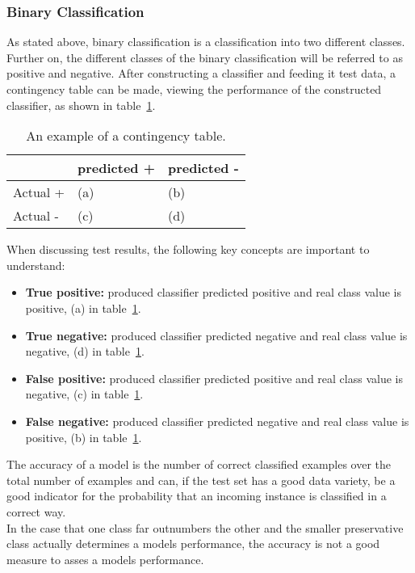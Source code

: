 \subsubsection{Binary Classification}
As stated above, binary classification is a classification into two different classes.
Further on, the different classes of the binary classification will be referred to as positive and negative.
After constructing a classifier and feeding it test data, a contingency table can be made, viewing the performance of the constructed classifier, as shown in table~\ref{tab:contingency}.
\begin{center}
	\begin{table}[H]
		\begin{tabular}{l|ll}
			& predicted + & predicted - \\ \hline
			Actual + &     (a)     &       (b)     \\
			Actual - &     (c)     &       (d)    
		\end{tabular}
		\caption{An example of a contingency table.}
		\label{tab:contingency}
	\end{table}
\end{center}
When discussing test results, the following key concepts are important to understand:
\begin{itemize}
	\item \textbf{True positive:} produced classifier predicted positive and real class value is positive, (a) in table~\ref{tab:contingency}. 
	\item \textbf{True negative:} produced classifier predicted negative and real class value is negative, (d) in table~\ref{tab:contingency}. 
	\item \textbf{False positive:} produced classifier predicted positive and real class value is negative, (c) in table~\ref{tab:contingency}. 
	\item \textbf{False negative:} produced classifier predicted negative and real class value is positive, (b) in table~\ref{tab:contingency}. 
\end{itemize} 
The accuracy of a model is the number of correct classified examples over the total number of examples and can, if the test set has a good data variety, be a good indicator for the probability that an incoming instance is classified in a correct way.\\
In the case that one class far outnumbers the other and the smaller preservative class actually determines a models performance, the accuracy is not a good measure to asses a models performance.
